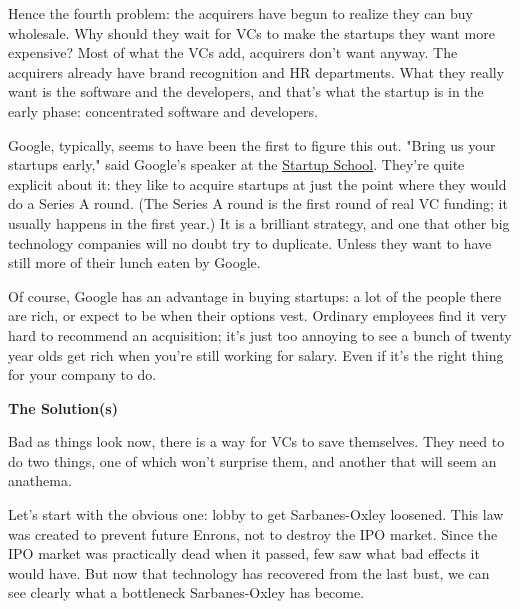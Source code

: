 Hence the fourth problem: the acquirers have
                  begun to realize they can buy wholesale. Why should they wait
                  for VCs to make the startups they want more expensive? Most of
                  what the VCs add, acquirers don't want anyway. The acquirers
                  already have brand recognition and HR departments. What they
                  really want is the software and the developers, and that's
                  what the startup is in the early phase: concentrated software
                  and developers.

Google, typically, seems to have
                  been the first to figure this out. "Bring us your startups
                  early," said Google's speaker at the
                  \href{http://startupschool.org}{Startup School}. They're
                  quite explicit about it: they like to acquire startups at just
                  the point where they would do a Series A round. (The Series A
                  round is the first round of real VC funding; it usually
                  happens in the first year.) It is a brilliant strategy, and
                  one that other big technology companies will no doubt try to
                  duplicate. Unless they want to have still more of their lunch
                  eaten by Google.

Of course, Google has an advantage
                  in buying startups: a lot of the people there are rich, or
                  expect to be when their options vest. Ordinary employees find
                  it very hard to recommend an acquisition; it's just too
                  annoying to see a bunch of twenty year olds get rich when
                  you're still working for salary. Even if it's the right thing
                  for your company to do.

\textbf{The Solution(s)}

Bad as things look now, there is a way for VCs to
                  save themselves. They need to do two things, one of which
                  won't surprise them, and another that will seem an
                  anathema.

Let's start with the obvious one: lobby
                  to get Sarbanes-Oxley loosened. This law was created to
                  prevent future Enrons, not to destroy the IPO market. Since
                  the IPO market was practically dead when it passed, few saw
                  what bad effects it would have. But now that technology has
                  recovered from the last bust, we can see clearly what a
                  bottleneck Sarbanes-Oxley has become.

